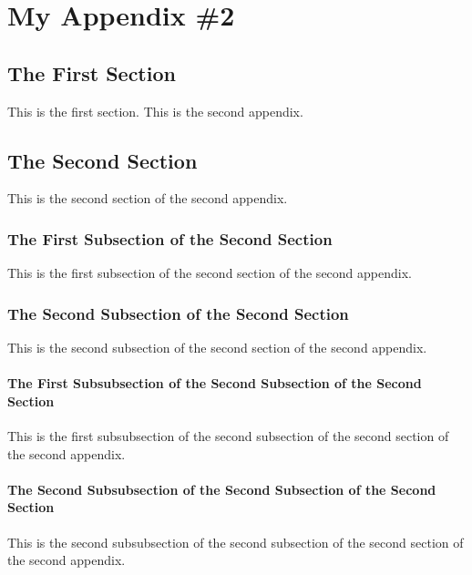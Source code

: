 \chapter{My Appendix \#2}
%
\section{The First Section}
This is the first section.
This is the second appendix.

\section{The Second Section}
This is the second section of the second appendix.

\subsection{The First Subsection of the Second Section}
This is the first subsection of the second section of the second appendix.

\subsection{The Second Subsection of the Second Section}
This is the second subsection of the second section of the second appendix.

\subsubsection{The First Subsubsection of the Second Subsection of
		the Second Section}
This is the first subsubsection of the second subsection of the
second section of the second appendix.

\subsubsection{The Second Subsubsection of the Second Subsection
		of the Second Section}
This is the second subsubsection of the second subsection of the
second section of the second appendix.

